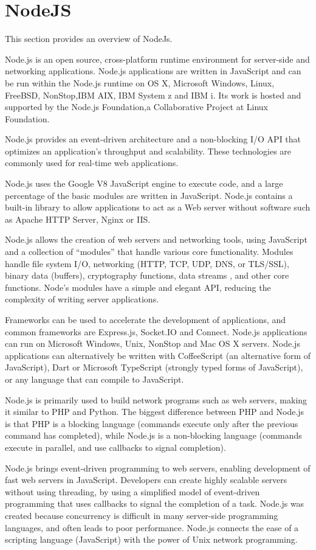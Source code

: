 \section{NodeJS}
\label{sec:TCH_nodejs}

This section provides an overview of NodeJs.

Node.js is an open source, cross-platform runtime environment for server-side and networking applications. Node.js applications are written in JavaScript and can be run within the Node.js runtime on OS X, Microsoft Windows, Linux, FreeBSD, NonStop,IBM AIX, IBM System z and IBM i. Its work is hosted and supported by the Node.js Foundation,a Collaborative Project at Linux Foundation.

Node.js provides an event-driven architecture and a non-blocking I/O API that optimizes an application's throughput and scalability. These technologies are commonly used for real-time web applications.

Node.js uses the Google V8 JavaScript engine to execute code, and a large percentage of the basic modules are written in JavaScript. Node.js contains a built-in library to allow applications to act as a Web server without software such as Apache HTTP Server, Nginx or IIS.

Node.js allows the creation of web servers and networking tools, using JavaScript and a collection of ``modules'' that handle various core functionality. Modules handle file system I/O, networking (HTTP, TCP, UDP, DNS, or TLS/SSL), binary data (buffers), cryptography functions, data streams , and other core functions. Node's modules have a simple and elegant API, reducing the complexity of writing server applications.

Frameworks can be used to accelerate the development of applications, and common frameworks are Express.js, Socket.IO and Connect. Node.js applications can run on Microsoft Windows, Unix, NonStop and Mac OS X servers. Node.js applications can alternatively be written with CoffeeScript (an alternative form of JavaScript), Dart or Microsoft TypeScript (strongly typed forms of JavaScript), or any language that can compile to JavaScript.

Node.js is primarily used to build network programs such as web servers, making it similar to PHP and Python. The biggest difference between PHP and Node.js is that PHP is a blocking language (commands execute only after the previous command has completed), while Node.js is a non-blocking language (commands execute in parallel, and use callbacks to signal completion).

Node.js brings event-driven programming to web servers, enabling development of fast web servers in JavaScript. Developers can create highly scalable servers without using threading, by using a simplified model of event-driven programming that uses callbacks to signal the completion of a task. Node.js was created because concurrency is difficult in many server-side programming languages, and often leads to poor performance. Node.js connects the ease of a scripting language (JavaScript) with the power of Unix network programming.
